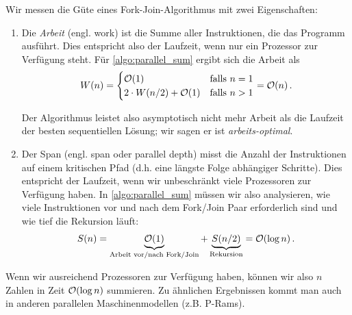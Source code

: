 Wir messen die Güte eines Fork-Join-Algorithmus mit zwei Eigenschaften:
\begin{enumerate}
    \item
          Die  \emph{Arbeit} (engl. work) ist die Summe aller Instruktionen, die das Programm ausführt.
          Dies entspricht also der Laufzeit, wenn nur ein Prozessor zur Verfügung steht.
          Für \cref{algo:parallel_sum} ergibt sich die Arbeit als
          \begin{equation}
              W(n) = \begin{cases}
                  \mathcal{O}\!\left(1\right)                  & \text{falls } n = 1 \\
                  2 \cdot W(n/2) + \mathcal{O}\!\left(1\right) & \text{falls } n > 1
              \end{cases}
              = \mathcal{O}\!\left(n\right).
          \end{equation}

          Der  Algorithmus leistet also asymptotisch nicht mehr Arbeit als die Laufzeit der besten sequentiellen Lösung; wir sagen er ist \emph{arbeits-optimal}.

    \item
          Der  Span (engl. span oder parallel depth) misst die Anzahl der Instruktionen auf einem kritischen Pfad (d.h. eine längste Folge abhängiger Schritte).
          Dies entspricht der Laufzeit, wenn wir unbeschränkt viele Prozessoren zur Verfügung haben.
          In \cref{algo:parallel_sum} müssen wir also analysieren, wie viele Instruktionen vor und nach dem Fork/Join Paar erforderlich sind und wie tief die Rekursion läuft:
          \begin{equation}
              S(n) = \underbrace{\mathcal{O}\!\left(1\right)}_\text{Arbeit vor/nach Fork/Join} + \underbrace{S(n/2)}_\text{Rekursion} = \mathcal{O}\!\left(\log n\right).
          \end{equation}
\end{enumerate}

Wenn wir ausreichend Prozessoren zur Verfügung haben, können wir also $n$ Zahlen in Zeit $\mathcal{O}\!\left(\log n\right)$ summieren.
Zu ähnlichen Ergebnissen kommt man auch in anderen parallelen Maschinenmodellen (z.B. P-Rams).

